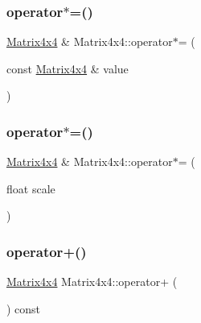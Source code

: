 \mbox{\label{struct_math_1_1_matrix4x4_a44bf597aad18c77f05d265cf88258207}} 
\subsubsection{\texorpdfstring{operator$\ast$=()}{operator*=()}\hspace{0.1cm}{\footnotesize\ttfamily [1/2]}}
{\footnotesize\ttfamily \mbox{\hyperlink{struct_math_1_1_matrix4x4}{Matrix4x4}} \& Matrix4x4\+::operator$\ast$= (\begin{DoxyParamCaption}\item[{const \mbox{\hyperlink{struct_math_1_1_matrix4x4}{Matrix4x4}} \&}]{value }\end{DoxyParamCaption})}

\mbox{\label{struct_math_1_1_matrix4x4_a2c940c611c86e4d27b8443a49710f29f}} 
\subsubsection{\texorpdfstring{operator$\ast$=()}{operator*=()}\hspace{0.1cm}{\footnotesize\ttfamily [2/2]}}
{\footnotesize\ttfamily \mbox{\hyperlink{struct_math_1_1_matrix4x4}{Matrix4x4}} \& Matrix4x4\+::operator$\ast$= (\begin{DoxyParamCaption}\item[{float}]{scale }\end{DoxyParamCaption})}

\mbox{\label{struct_math_1_1_matrix4x4_a1962a62b402bfb5076a67cc87e5fb4d7}} 
\subsubsection{\texorpdfstring{operator+()}{operator+()}}
{\footnotesize\ttfamily \mbox{\hyperlink{struct_math_1_1_matrix4x4}{Matrix4x4}} Matrix4x4\+::operator+ (\begin{DoxyParamCaption}{ }\end{DoxyParamCaption}) const}

